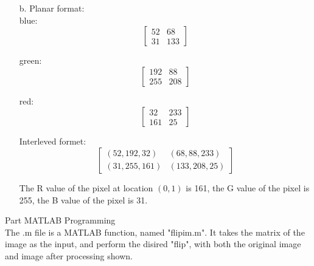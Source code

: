 \documentclass[a4paper]{article}
\begin{document}
\begin{spacing}{2.0}
\begin{enumerate}
	\item[b. ]
	Planar format: \\
	blue: 
	$$\left [ \begin{matrix}
	52 & 68\\
	31 & 133
	\end{matrix} \right ]$$
	
	green: 
	$$\left [ \begin{matrix}
	192 & 88\\
	255 & 208
	\end{matrix} \right ]$$
	
	red: 
	$$\left [ \begin{matrix}
	32 & 233\\
	161 & 25
	\end{matrix} \right ]$$
	
	Interleved formet: 
	 $$\left [ \begin{matrix}
	(52, 192, 32) & (68, 88, 233)\\
	(31, 255, 161) & (133, 208, 25)
	\end{matrix} \right ]$$
	
	The R value of the pixel at location $(0,1)$ is 161, the G value of the pixel is 255, the B value of the pixel is 31.\\
	\end{enumerate}


\huge{Part \uppercase\expandafter{} MATLAB Programming}\\
\normalsize
The .m file is a MATLAB function, named "flipim.m". It takes the matrix of the image as the input, and perform the disired "flip", with both the original image and image after processing shown.
	

\end{spacing}
\end{document}
